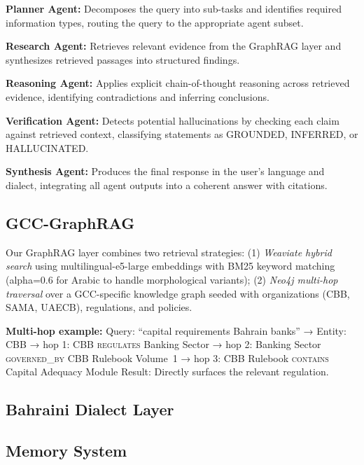\documentclass[11pt]{article}
\begin{document}
\textbf{Planner Agent:} Decomposes the query into sub-tasks and identifies
required information types, routing the query to the appropriate agent subset.

\textbf{Research Agent:} Retrieves relevant evidence from the GraphRAG layer
and synthesizes retrieved passages into structured findings.

\textbf{Reasoning Agent:} Applies explicit chain-of-thought reasoning across
retrieved evidence, identifying contradictions and inferring conclusions.

\textbf{Verification Agent:} Detects potential hallucinations by checking
each claim against retrieved context, classifying statements as
GROUNDED, INFERRED, or HALLUCINATED.

\textbf{Synthesis Agent:} Produces the final response in the user's language
and dialect, integrating all agent outputs into a coherent answer with citations.

\subsection{GCC-GraphRAG}

Our GraphRAG layer combines two retrieval strategies:
(1) \textit{Weaviate hybrid search} using multilingual-e5-large embeddings
with BM25 keyword matching (alpha=0.6 for Arabic to handle morphological variants);
(2) \textit{Neo4j multi-hop traversal} over a GCC-specific knowledge graph
seeded with organizations (CBB, SAMA, UAECB), regulations, and policies.

\textbf{Multi-hop example:}
Query: ``capital requirements Bahrain banks''
→ Entity: CBB
→ hop 1: CBB \textsc{regulates} Banking Sector
→ hop 2: Banking Sector \textsc{governed\_by} CBB Rulebook Volume~1
→ hop 3: CBB Rulebook \textsc{contains} Capital Adequacy Module
Result: Directly surfaces the relevant regulation.

\subsection{Bahraini Dialect Layer}

\subsection{Memory System}
\end{document}
